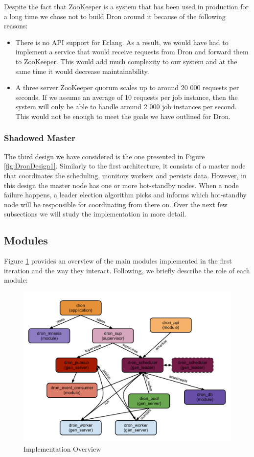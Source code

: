 \documentclass[11pt,a4paper,twoside]{report}
\begin{document}
Despite the fact that ZooKeeper is a system that has been used in production for a long time we chose not to build Dron around it because of the following reasons:
\begin{itemize}
\item{}
There is no API support for Erlang. As a result, we would have had to implement a service that would receive requests from Dron and forward them to ZooKeeper. This would add much complexity to our system and at the same time it would decrease maintainability. 
\item{}
A three server ZooKeeper quorum scales up to around 20 000 requests per seconds. If we assume an average of 10 requests per job instance, then the system will only be able to handle around 2 000 job instances per second. This would not be enough to meet the goals we have outlined for Dron.
\end{itemize}

\subsubsection{Shadowed Master}
The third design we have considered is the one presented in Figure \ref{fig:DronDesign1}. Similarly to the first architecture, it consists of a master node that coordinates the scheduling, monitors workers and persists data. However, in this design the master node has one or more hot-standby nodes. When a node failure happens, a leader election algorithm picks and informs which hot-standby node will be responsible for coordinating from there on. Over the next few subsections we will study the implementation in more detail.

\subsection{Modules}
Figure \ref{fig:DronErlang} provides an overview of the main modules implemented in the first iteration and the way they interact. Following, we briefly describe the role of each module:

\begin{figure}[h]
\centering
\includegraphics[scale=0.65]{DronErlang}
\caption{Implementation Overview}
\label{fig:DronErlang}
\end{figure}
\end{document}
